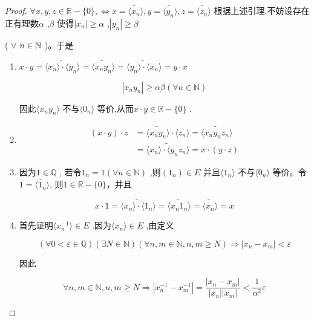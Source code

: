 \begin{proof}

\(\forall x,y,z \in \mathbb{R} - \{0\}, \Leftrightarrow x = \widetilde{\langle x_n \rangle}, y = \widetilde{\langle y_n \rangle}, z = \widetilde{\langle z_n \rangle}\) 根据上述引理,不妨设存在正有理数\(\alpha\) ,\(\beta\) 使得\(|x_n| \ge \alpha\) ,\(|y_n| \ge \beta\)

( \(\forall\)  \( n \in \mathbb{N} \) )。于是 

\begin{enumerate}[label=\arabic*)]

\item \(x \cdot y = \widetilde{\langle x_n \rangle \cdot \langle y_n \rangle}  = \widetilde{\langle x_n y_n \rangle}  = \widetilde{\langle y_n \rangle \cdot \langle x_n \rangle} = y \cdot x\)

\[
|x_ny_n| \ge \alpha\beta (\forall n \in \mathbb{N})
\] 

因此\(\langle x_n y_n \rangle\) 不与\(\langle 0_n \rangle\) 等价,从而\(x \cdot y \in \mathbb{R} - \{0\}\) .

\item
\begin{align*}
	(x \cdot y) \cdot z 
	&= \widetilde{\langle x_n y_n \rangle} \cdot \langle z_n \rangle = \widetilde{\langle x_n y_n z_n\rangle} \\
	&= \widetilde{\langle x_n\rangle \cdot \langle y_n z_n\rangle }  = x \cdot (y \cdot z)
\end{align*}


\item
  因为\(1 \in \mathbb{Q}\) , 若令\(1_n = 1(\forall n \in \mathbb{N})\) ,则\((1_n) \in E\) 并且\(\langle 1_n \rangle \) 不与\(\langle 0_n \rangle\) 等价。令\(1 = \widetilde{\langle 1_n \rangle}\), 则\(1 \in \mathbb{R} - \{0\}\)，并且
  
  \[
  x \cdot 1 = \widetilde{\langle x_n \rangle \cdot \langle 1_n \rangle} = \widetilde{\langle x_n 1_n \rangle} = \widetilde{\langle x_n \rangle} = x
  \] 

\item
  首先证明\(\langle x_n^{-1} \rangle \in E\) .因为\(\langle x_n \rangle \in E\) ,由定义

\[
(\forall 0 < \varepsilon \in \mathbb{Q}) (\exists N \in \mathbb{N}) (\forall n, m \in \mathbb{N}, n, m \geqslant N) \Longrightarrow |x_n - x_m| < \varepsilon
\]

因此

\[
\forall n, m \in \mathbb{N}, n, m \geq N \Longrightarrow |x_n^{-1} - x_m^{-1}| = \frac{|x_n - x_m|}{|x_n| |x_m|} < \frac{1}{\alpha^2} \varepsilon
\] 


\end{enumerate}
\end{proof}
